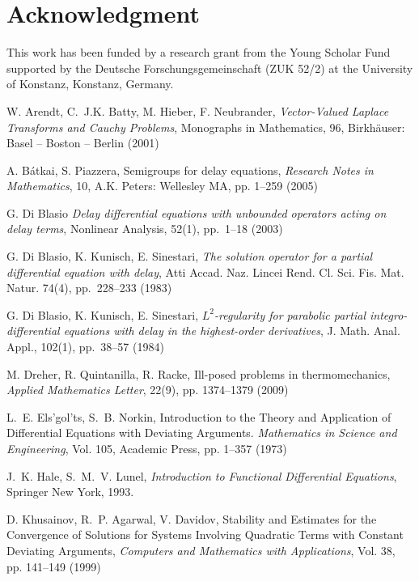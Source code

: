 \documentclass[12pt]{article}
\numberwithin{equation}{section}
\numberwithin{equation}{section}
\begin{document}
\section*{Acknowledgment}
This work has been funded by a research grant from the Young Scholar Fund
supported by the Deutsche Forschungsgemeinschaft (ZUK 52/2) at the University of Konstanz, Konstanz, Germany.

\begin{thebibliography}{1}
	{\sc W. Arendt, C.~J.K. Batty, M. Hieber, F. Neubrander},
	{\it Vector-Valued Laplace Transforms and Cauchy Problems},
	Monographs in Mathematics, 96, Birkh\"auser: Basel -- Boston -- Berlin (2001)

	{\sc A. B\'{a}tkai, S. Piazzera},
	Semigroups for delay equations,
	{\em Research Notes in Mathematics}, 10, A.K. Peters: Wellesley MA, pp. 1--259 (2005)
	
	{\sc G. Di Blasio}
	{\em Delay differential equations with unbounded operators acting on delay terms},
	Nonlinear Analysis, 52(1), pp.~1--18
	(2003)
	
	{\sc G. Di Blasio, K. Kunisch, E. Sinestari},
	{\em The solution operator for a partial differential equation with delay},
	Atti Accad. Naz. Lincei Rend. Cl. Sci. Fis. Mat. Natur. 74(4), pp.~228--233
	(1983)
	
	{\sc G. Di Blasio, K. Kunisch, E. Sinestari},
	{\em $L^{2}$-regularity for parabolic partial integro-differential equations with delay in the highest-order derivatives},
	J. Math. Anal. Appl., 102(1), pp.~38--57
	(1984)
	
	{\sc M. Dreher, R. Quintanilla, R. Racke},
	Ill-posed problems in thermomechanics,
	{\em Applied Mathematics Letter}, 22(9), pp. 1374--1379 (2009)
	
	{\sc L.~E. Els'gol'ts, S.~B. Norkin}, 
	Introduction to the Theory and Application of Differential Equations with Deviating Arguments. 
	{\em Mathematics in Science and Engineering}, Vol. 105, Academic Press, pp. 1--357 (1973)

	{\sc J.~K. Hale, S.~M.~V. Lunel},
	{\it Introduction to Functional Differential Equations},
	Springer New York, 1993.

	{\sc D. Khusainov, R.~P. Agarwal, V. Davidov},
	Stability and Estimates for the Convergence of Solutions for
	Systems Involving Quadratic Terms with Constant Deviating Arguments,
	{\em Computers and Mathematics with Applications}, Vol. 38, pp. 141--149 (1999)


\end{thebibliography}
\end{document}
